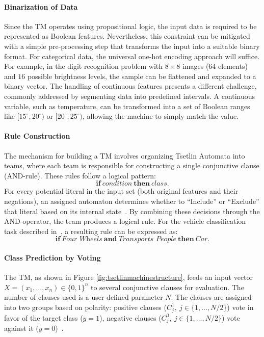 \documentclass[english]{aghengthesis} %
\begin{document}
\paragraph{Binarization of Data}
Since the TM operates using propositional logic, the input data is required to be represented as Boolean features. Nevertheless, this constraint can be mitigated with a simple pre-processing step that transforms the input into a suitable binary format. For categorical data, the universal one-hot encoding approach will suffice. For example, in the digit recognition problem with $8 \times 8$ images ($64$ elements) and $16$ possible brightness levels, the sample can be flattened and expanded to a binary vector. The handling of continuous features presents a different challenge, commonly addressed by segmenting data into predefined intervals. A continuous variable, such as temperature, can be transformed into a set of Boolean ranges like $[15^\circ,20^\circ)$ or $[20^\circ,25^\circ)$, allowing the machine to simply match the value.


\paragraph{Rule Construction}
The mechanism for building a TM involves organizing Tsetlin Automata into teams, where each team is responsible for constructing a single conjunctive clause (AND-rule). These rules follow a logical pattern:
$$\textbf{if} \ \textit{condition} \ \textbf{then} \ \textit{class} \text{.}$$
For every potential literal in the input set (both original features and their negations), an assigned automaton determines whether to ``Include'' or ``Exclude'' that literal based on its internal state~\cite{granmo2021tsetlinmachinegame}. By combining these decisions through the AND-operator, the team produces a logical rule. For the vehicle classification task described in~\cite{granmo2022tsetlinmachinebookchap1}, a resulting rule can be expressed as: 
$$\textbf{if} \ \textit{Four Wheels} \ \textbf{and} \ \textit{Transports People} \ \textbf{then} \ \textit{Car} \text{.}$$

\paragraph{Class Prediction by Voting}
The TM, as shown in Figure \ref{fig:tsetlinmachinestructure}, feeds an input vector $X = (x_1, \dots, x_n) \in \{0,1\}^n$ to several conjunctive clauses for evaluation. The number of clauses used is a user-defined parameter $N$. The clauses are assigned into two groups based on polarity: positive clauses ($C_j^1, \ j \in \{1,\dots,N/2\}$) vote in favor of the target class ($y=1$), negative clauses ($C_j^0, \ j \in \{1,\dots,N/2\}$) vote against it ($y=0$)~\cite{granmo2021tsetlinmachinegame}.
\end{document}
